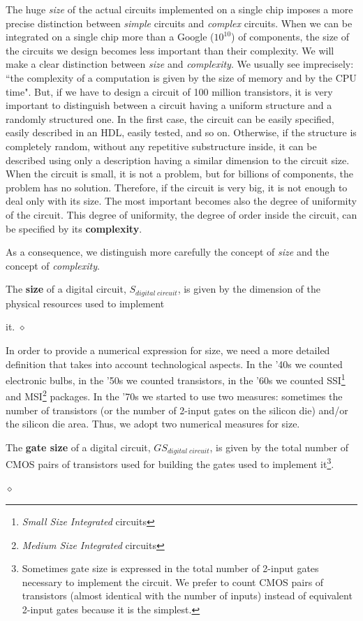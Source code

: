 The huge {\em size} of the actual circuits implemented on a single
chip imposes a more precise distinction between {\em simple}
circuits and {\em complex} circuits. When we can be integrated on a
single chip more than a Google ($10^{10}$) of components, 
the size of the circuits we design 
becomes less important than their complexity. We will
make a clear distinction between {\em size} and {\em
complexity}. We usually see imprecisely: ``the complexity of a computation is
given by the size of memory and by the CPU time". But, if we have
to design a circuit of 100 million transistors, it is very important
to distinguish between a circuit having a uniform structure and a randomly structured one. 
In the first case, the circuit can be
easily specified, easily described in an HDL, easily tested, and so on.
Otherwise, if the structure is completely random, without any
repetitive substructure inside, it can be described using only a
description having a similar dimension to the circuit size. When
the circuit is small, it is not a problem, but for billions of
components, the problem has no solution. Therefore, if the circuit
is very big, it is not enough to deal only with its size. The most
important becomes also the degree of uniformity of the circuit.
This degree of uniformity, the degree of order inside the circuit,
can be specified by its {\bf complexity}.

As a consequence, we distinguish more carefully the concept of
{\em size} and the concept of {\em complexity}. 

\begin{definition}
The {\bf size} of a digital circuit, $S_{digital \; circuit}$, is
given by the dimension of the physical resources used to implement

it.
$\diamond$
\end{definition}

In order to provide a numerical expression for size, we need a more
detailed definition that takes into account technological
aspects. In the '40s we counted electronic bulbs, in the '50s we
counted transistors, in the '60s we counted SSI\footnote{{\em
Small Size Integrated} circuits} and MSI\footnote{{\em Medium Size
Integrated} circuits} packages. In the '70s we started to use two
measures: sometimes the number of transistors (or the number of
2-input gates on the silicon die) and/or the silicon die
area. Thus, we adopt two numerical measures for size.

\begin{definition}
The {\bf gate size} of a digital circuit, $GS_{digital \;
circuit}$, is given by the total number of CMOS pairs of
transistors used for building the gates  used to implement it\footnote{Sometimes gate size
is expressed in the total number of 2-input gates necessary to
implement the circuit. We prefer to count CMOS pairs of
transistors (almost identical with the number of inputs) instead
of equivalent 2-input gates because it is the simplest.}.

$\diamond$
\end{definition}

